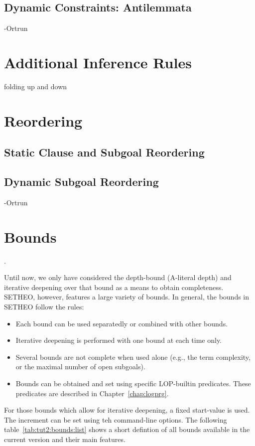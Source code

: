 \subsection{Dynamic Constraints: Antilemmata}

-Ortrun

\section{Additional Inference Rules}

folding up and down

\section{Reordering}
\subsection{Static Clause and Subgoal Reordering}

\subsection{Dynamic Subgoal Reordering}

-Ortrun

\section{Bounds}
\label{sec:tut2:bounds}.

Until now, we only have considered the depth-bound (A-literal depth)
and iterative deepening over that bound as a means to obtain completeness.
SETHEO, however, features a large variety of bounds.
In general, the bounds in SETHEO follow the rules:
\begin{itemize}
\item
Each bound can be used separatedly or combined with other bounds.
\item
Iterative deepening is performed with one bound at each time only.
\item
Several bounds are not complete when used alone (e.g., the term complexity,
or the maximal number of open subgoals).
\item
Bounds can be obtained and set using specific LOP-builtin predicates.
These predicates are described in Chapter~\ref{chap:logprg}.
\end{itemize}

For those bounds which allow for iterative deepening, a fixed start-value
is used. The increment can be set using teh command-line options.
The following table~\ref{tab:tut2:bounds:list} shows a short
defintion of all bounds available in the current version and their main
features.

